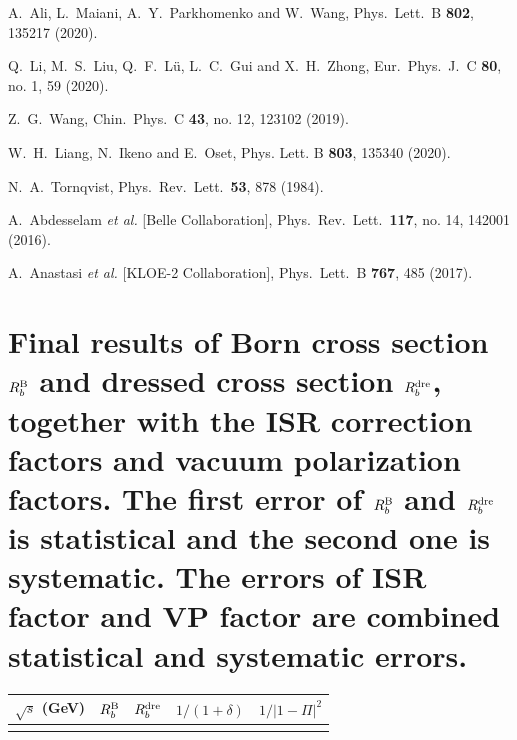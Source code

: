 \documentclass[aps,showpacs,superscriptaddress,preprint,tightenlines]{revtex4}
\begin{document}
\begin{thebibliography}{**}
  A.~Ali, L.~Maiani, A.~Y.~Parkhomenko and W.~Wang,
  Phys.\ Lett.\ B {\bf 802}, 135217 (2020).

  Q.~Li, M.~S.~Liu, Q.~F.~Lü, L.~C.~Gui and X.~H.~Zhong,
  Eur.\ Phys.\ J.\ C {\bf 80}, no. 1, 59 (2020).

  Z.~G.~Wang,
  Chin.\ Phys.\ C {\bf 43}, no. 12, 123102 (2019).

W.~H.~Liang, N.~Ikeno and E.~Oset,
Phys. Lett. B \textbf{803}, 135340 (2020).

N.~A.~Tornqvist,
Phys.\ Rev.\ Lett.\  {\bf 53}, 878 (1984).

  A.~Abdesselam {\it et al.} [Belle Collaboration],
  Phys.\ Rev.\ Lett.\  {\bf 117}, no. 14, 142001 (2016).

  A.~Anastasi {\it et al.} [KLOE-2 Collaboration],
  Phys.\ Lett.\ B {\bf 767}, 485 (2017).

\end{thebibliography}

\clearpage

\appendix

\section{Final results of Born cross section $R_b^{\rm B}$ and dressed cross section $R_b^{\rm{dre}}$, together with
the ISR correction factors and vacuum polarization factors. The first error of $R_b^{\rm B}$ and $R_b^{\rm{dre}}$ is statistical and the second one is systematic. The errors of ISR factor and VP factor are combined statistical and systematic errors.}

\begin{center}

\begin{longtable}{C{1.6cm}C{4.25cm}C{4.25cm}C{2.75cm}C{2.75cm}}
  \hline\hline
  $\sqrt{s}$ (GeV) & $R_b^{\rm B}$& $R_b^{\rm{dre}}$
          &$1/(1+\delta)$
          & $1/|1-\Pi|^2$\\\hline
  \endhead
  
  \hline\hline
  \endfoot

  \end{longtable}

\end{center}
\end{document}

